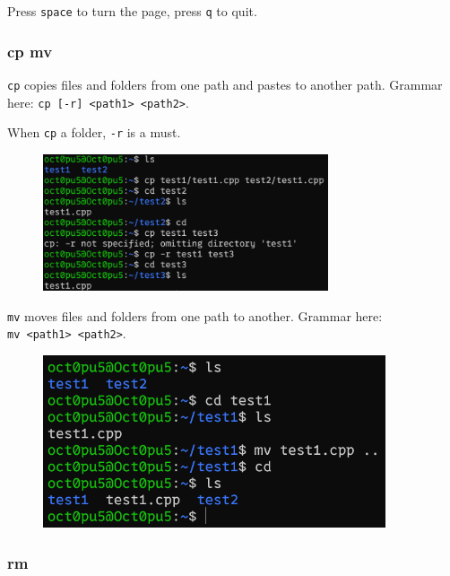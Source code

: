 \documentclass[12pt]{ctexart}
\newenvironment{mdquote}
{%
  \par\noindent
  \begin{list}{}{%
      \setlength{\leftmargin}{1em}%
      \setlength{\rightmargin}{0pt}%
      \setlength{\itemindent}{0pt}%
      \setlength{\listparindent}{\parindent}%
      \setlength{\topsep}{0.5\baselineskip}%
  }
  \item[\textbf{>}\ ]\itshape
}
{\end{list}\par}
\begin{document}
\begin{mdquote}
Press \texttt{space} to turn the page, press \texttt{q} to quit.
\end{mdquote}

\subsubsection{\textbf{cp mv}}

\texttt{cp} copies files and folders from one path and pastes to another
path. Grammar here:
\texttt{cp\ {[}-r{]}\ \textless{}path1\textgreater{}\ \textless{}path2\textgreater{}}.

When \texttt{cp} a folder, \texttt{-r} is a must.

\begin{figure}[H]
    \centering
    \includegraphics[width=0.75\textwidth,keepaspectratio]{assets/Linux/1.5 Linux file commands/4.png}
\end{figure}

\texttt{mv} moves files and folders from one path to another. Grammar
here:
\texttt{mv\ \textless{}path1\textgreater{}\ \textless{}path2\textgreater{}}.

\begin{figure}[H]
    \centering
    \includegraphics[width=0.9\textwidth,keepaspectratio]{assets/Linux/1.5 Linux file commands/5.png}
\end{figure}

\subsubsection{\textbf{rm}}
\end{document}
